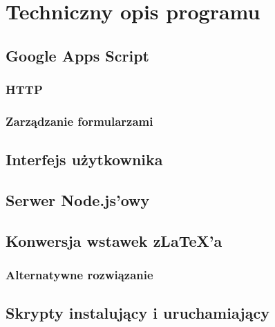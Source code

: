 \chapter{Techniczny opis programu}
\section{Google Apps Script}
\subsection{HTTP}
\subsection{Zarządzanie formularzami}
\section{Interfejs użytkownika}
\section{Serwer Node.js'owy}

\section{Konwersja wstawek z\LaTeX'a}
\subsection{Alternatywne rozwiązanie}%
 
\section{Skrypty instalujący i uruchamiający}
